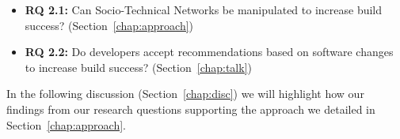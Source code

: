 \begin{itemize}
  \item\textbf{RQ 2.1:} Can Socio-Technical Networks be manipulated to increase build success? (Section~\ref{chap:approach})
  \item\textbf{RQ 2.2:} Do developers accept recommendations based on software changes to increase build success? (Section~\ref{chap:talk})
\end{itemize}

In the following discussion (Section~\ref{chap:disc}) we will highlight how our findings from our research questions supporting the approach we detailed in Section~\ref{chap:approach}.









